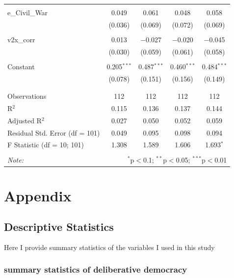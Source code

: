 \documentclass[12pt]{article}\usepackage[]{graphicx}\usepackage[]{color}
\begin{document}
\begin{table}[!htbp]
\begin{tabular}{@{\extracolsep{5pt}}lcccc}
  & & & & \\ 
 e\_Civil\_War & 0.049 & 0.061 & 0.048 & 0.058 \\ 
  & (0.036) & (0.069) & (0.072) & (0.069) \\ 
  & & & & \\ 
 v2x\_corr & 0.013 & $-$0.027 & $-$0.020 & $-$0.045 \\ 
  & (0.030) & (0.059) & (0.061) & (0.058) \\ 
  & & & & \\ 
 Constant & 0.205$^{***}$ & 0.487$^{***}$ & 0.460$^{***}$ & 0.484$^{***}$ \\ 
  & (0.078) & (0.151) & (0.156) & (0.149) \\ 
  & & & & \\ 
\hline \\[-1.8ex] 
Observations & 112 & 112 & 112 & 112 \\ 
R$^{2}$ & 0.115 & 0.136 & 0.137 & 0.144 \\ 
Adjusted R$^{2}$ & 0.027 & 0.050 & 0.052 & 0.059 \\ 
Residual Std. Error (df = 101) & 0.049 & 0.095 & 0.098 & 0.094 \\ 
F Statistic (df = 10; 101) & 1.308 & 1.589 & 1.606 & 1.693$^{*}$ \\ 
\hline 
\hline \\[-1.8ex] 
\textit{Note:}  & \multicolumn{4}{r}{$^{*}$p$<$0.1; $^{**}$p$<$0.05; $^{***}$p$<$0.01} \\ 
\end{tabular} 
\end{table} 







\newpage

\section{Appendix}



\subsection{Descriptive Statistics}

Here I provide summary statistics of the variables I used in this study

\subsubsection{summary statistics of deliberative democracy}
\end{document}
